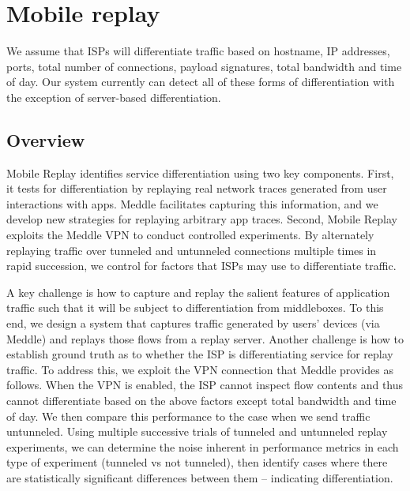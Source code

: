 \documentclass[letterpaper]{sig-alternate-2013}
\begin{document}
\section{Mobile replay}
\label{sec:method}

We assume that ISPs will differentiate traffic based on hostname, IP addresses, ports, total number of connections, payload signatures, total bandwidth and time of day. Our system currently can detect all of these forms of differentiation with the exception of server-based differentiation.

\subsection{Overview} Mobile Replay identifies service differentiation using two key components. First, it tests for differentiation by replaying real network traces generated from user interactions with apps. Meddle \cite{meddle} facilitates capturing this information, and we develop new strategies for replaying arbitrary app traces. Second, Mobile Replay exploits the Meddle VPN to conduct controlled experiments. By alternately replaying traffic over tunneled and untunneled connections multiple times in rapid succession, we control for factors that ISPs may use to differentiate traffic.

A key challenge is how to capture and replay the salient features of application traffic such that it will be subject to differentiation from middleboxes. To this end, we design a system that captures traffic generated by users' devices (via Meddle) and replays those flows from a replay server. Another challenge is how to establish ground truth as to whether the ISP is differentiating service for replay traffic. To address this, we exploit the VPN connection that Meddle provides as follows. When the VPN is enabled, the ISP cannot inspect flow contents and thus cannot differentiate based on the above factors except total bandwidth and time of day. We then compare this performance to the case when we send traffic untunneled. Using multiple successive trials of tunneled and untunneled replay experiments, we can determine the noise inherent in performance metrics in each type of experiment (tunneled vs not tunneled), then identify cases where there are statistically significant differences between them -- indicating differentiation.
\end{document}
